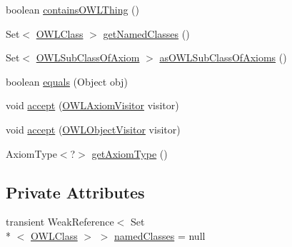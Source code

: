 \begin{DoxyCompactItemize}
\item 
boolean \hyperlink{classuk_1_1ac_1_1manchester_1_1cs_1_1owl_1_1owlapi_1_1_o_w_l_equivalent_classes_axiom_impl_af514cad02c057b0837dd47b7694a05bc}{contains\-O\-W\-L\-Thing} ()
\item 
Set$<$ \hyperlink{interfaceorg_1_1semanticweb_1_1owlapi_1_1model_1_1_o_w_l_class}{O\-W\-L\-Class} $>$ \hyperlink{classuk_1_1ac_1_1manchester_1_1cs_1_1owl_1_1owlapi_1_1_o_w_l_equivalent_classes_axiom_impl_acada44c76f3d9d8df24d79450bbee96d}{get\-Named\-Classes} ()
\item 
Set$<$ \hyperlink{interfaceorg_1_1semanticweb_1_1owlapi_1_1model_1_1_o_w_l_sub_class_of_axiom}{O\-W\-L\-Sub\-Class\-Of\-Axiom} $>$ \hyperlink{classuk_1_1ac_1_1manchester_1_1cs_1_1owl_1_1owlapi_1_1_o_w_l_equivalent_classes_axiom_impl_a4721000f8e39537c8c2c569a29c92ce3}{as\-O\-W\-L\-Sub\-Class\-Of\-Axioms} ()
\item 
boolean \hyperlink{classuk_1_1ac_1_1manchester_1_1cs_1_1owl_1_1owlapi_1_1_o_w_l_equivalent_classes_axiom_impl_aa4f29464ae857d16e964eaa96b5f9f41}{equals} (Object obj)
\item 
void \hyperlink{classuk_1_1ac_1_1manchester_1_1cs_1_1owl_1_1owlapi_1_1_o_w_l_equivalent_classes_axiom_impl_a837416d9138b1bbe87beae974e431a30}{accept} (\hyperlink{interfaceorg_1_1semanticweb_1_1owlapi_1_1model_1_1_o_w_l_axiom_visitor}{O\-W\-L\-Axiom\-Visitor} visitor)
\item 
void \hyperlink{classuk_1_1ac_1_1manchester_1_1cs_1_1owl_1_1owlapi_1_1_o_w_l_equivalent_classes_axiom_impl_aa3ec2f5acc1c1cd0656026267c4068e8}{accept} (\hyperlink{interfaceorg_1_1semanticweb_1_1owlapi_1_1model_1_1_o_w_l_object_visitor}{O\-W\-L\-Object\-Visitor} visitor)
\item 
Axiom\-Type$<$?$>$ \hyperlink{classuk_1_1ac_1_1manchester_1_1cs_1_1owl_1_1owlapi_1_1_o_w_l_equivalent_classes_axiom_impl_a68260bbc9146c89708fd5422cb804ccd}{get\-Axiom\-Type} ()
\end{DoxyCompactItemize}
\subsection*{Private Attributes}
\begin{DoxyCompactItemize}
\item 
transient Weak\-Reference$<$ Set\\*
$<$ \hyperlink{interfaceorg_1_1semanticweb_1_1owlapi_1_1model_1_1_o_w_l_class}{O\-W\-L\-Class} $>$ $>$ \hyperlink{classuk_1_1ac_1_1manchester_1_1cs_1_1owl_1_1owlapi_1_1_o_w_l_equivalent_classes_axiom_impl_a209cdbca0fcd3ddd46e44a076859eddb}{named\-Classes} = null
\end{DoxyCompactItemize}
